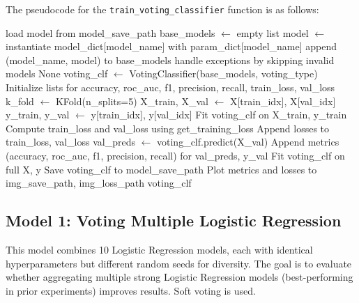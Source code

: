The pseudocode for the \texttt{train\_voting\_classifier} function is as follows:

\begin{algorithm}[H]
\caption{\texttt{train\_voting\_classifier}}
\begin{algorithmic}[1]
        \State \Return load model from model\_save\_path
    \EndIf
    \State base\_models $\gets$ empty list
        \State model $\gets$ instantiate model\_dict[model\_name] with param\_dict[model\_name]
        \State append (model\_name, model) to base\_models
        \State handle exceptions by skipping invalid models
    \EndFor
        \State \Return None
    \EndIf
    \State voting\_clf $\gets$ VotingClassifier(base\_models, voting\_type)
    \State Initialize lists for accuracy, roc\_auc, f1, precision, recall, train\_loss, val\_loss
    \State k\_fold $\gets$ KFold(n\_splits=5)
        \State X\_train, X\_val $\gets$ X[train\_idx], X[val\_idx]
        \State y\_train, y\_val $\gets$ y[train\_idx], y[val\_idx]
        \State Fit voting\_clf on X\_train, y\_train
        \State Compute train\_loss and val\_loss using get\_training\_loss
        \State Append losses to train\_loss, val\_loss
        \State val\_preds $\gets$ voting\_clf.predict(X\_val)
        \State Append metrics (accuracy, roc\_auc, f1, precision, recall) for val\_preds, y\_val
    \EndFor
    \State Fit voting\_clf on full X, y
    \State Save voting\_clf to model\_save\_path
    \State Plot metrics and losses to img\_save\_path, img\_loss\_path
    \State \Return voting\_clf
\EndProcedure
\end{algorithmic}
\end{algorithm}

\subsection{Model 1: Voting Multiple Logistic Regression}
This model combines 10 Logistic Regression models, each with identical hyperparameters but different random seeds for diversity. The goal is to evaluate whether aggregating multiple strong Logistic Regression models (best-performing in prior experiments) improves results. Soft voting is used.

